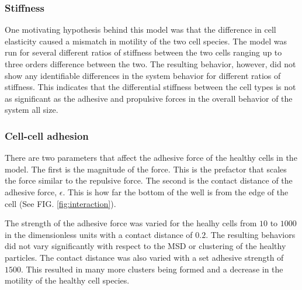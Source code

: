 \documentclass[aps,prb,twocolumn,groupedaddress,nofootinbib,floatfix]{revtex4}
\begin{document}
\subsubsection{Stiffness}

One motivating hypothesis behind this model was that the difference in cell elasticity caused a mismatch in motility of the two cell species.
The model was run for several different ratios of stiffness between the two cells ranging up to three orders difference between the two.
The resulting behavior, however, did not show any identifiable differences in the system behavior for different ratios of stiffness.
This indicates that the differential stiffness between the cell types is not as significant as the adhesive and propulsive forces in the overall behavior of the system all size.

\subsubsection{Cell-cell adhesion}

There are two parameters that affect the adhesive force of the healthy cells in the model.
The first is the magnitude of the force.
This is the prefactor that scales the force similar to the repulsive force.
The second is the contact distance of the adhesive force, $\epsilon$.
This is how far the bottom of the well is from the edge of the cell (See FIG. \ref{fig:interaction}).

The strength of the adhesive force was varied for the healhy cells from $10$ to $1000$ in the dimensionless units with a contact distance of $0.2$.
The resulting behaviors did not vary significantly with respect to the MSD or clustering of the healthy particles.
The contact distance was also varied with a set adhesive strength of $1500$.
This resulted in many more clusters being formed and a decrease in the motility of the healthy cell species.
\end{document}
